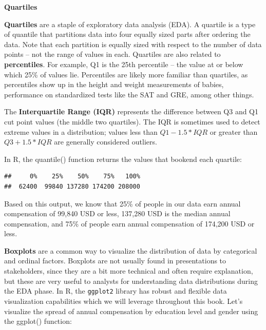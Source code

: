 \documentclass[]{book}
\newenvironment{Shaded}{\begin{snugshade}}{\end{snugshade}}
\newcommand{\CommentTok}[1]{\textcolor[rgb]{0.56,0.35,0.01}{\textit{#1}}}
\newcommand{\KeywordTok}[1]{\textcolor[rgb]{0.13,0.29,0.53}{\textbf{#1}}}
\newcommand{\NormalTok}[1]{#1}
\newcommand{\OperatorTok}[1]{\textcolor[rgb]{0.81,0.36,0.00}{\textbf{#1}}}
\begin{document}
\textbf{Quartiles}

\textbf{Quartiles} are a staple of exploratory data analysis (EDA). A quartile is a type of quantile that partitions data into four equally sized parts after ordering the data. Note that each partition is equally sized with respect to the number of data points -- not the range of values in each. Quartiles are also related to \textbf{percentiles}. For example, Q1 is the 25th percentile -- the value at or below which 25\% of values lie. Percentiles are likely more familiar than quartiles, as percentiles show up in the height and weight measurements of babies, performance on standardized tests like the SAT and GRE, among other things.

The \textbf{Interquartile Range (IQR)} represents the difference between Q3 and Q1 cut point values (the middle two quartiles). The IQR is sometimes used to detect extreme values in a distribution; values less than \(Q1 - 1.5 * IQR\) or greater than \(Q3 + 1.5 * IQR\) are generally considered outliers.

In R, the quantile() function returns the values that bookend each quartile:

\begin{Shaded}
\end{Shaded}

\begin{verbatim}
##     0%    25%    50%    75%   100% 
##  62400  99840 137280 174200 208000
\end{verbatim}

Based on this output, we know that 25\% of people in our data earn annual compensation of 99,840 USD or less, 137,280 USD is the median annual compensation, and 75\% of people earn annual compensation of 174,200 USD or less.

\textbf{Boxplots} are a common way to visualize the distribution of data by categorical and ordinal factors. Boxplots are not usually found in presentations to stakeholders, since they are a bit more technical and often require explanation, but these are very useful to analysts for understanding data distributions during the EDA phase. In R, the \texttt{ggplot2} library has robust and flexible data visualization capabilities which we will leverage throughout this book. Let's visualize the spread of annual compensation by education level and gender using the ggplot() function:
\end{document}
